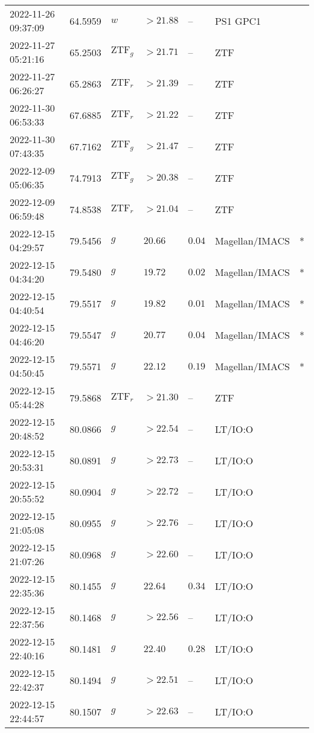 \documentclass{nature_plusfigure}
\begin{document}
\begin{supplement}
\begin{center}
\begin{longtable}{lllllll}
2022-11-26 09:37:09 & 64.5959 & $w$ & $>21.88$ & -- & PS1 GPC1 &  \\ 
2022-11-27 05:21:16 & 65.2503 & $\mathrm{ZTF}_{g}$ & $>21.71$ & -- & ZTF &  \\ 
2022-11-27 06:26:27 & 65.2863 & $\mathrm{ZTF}_{r}$ & $>21.39$ & -- & ZTF &  \\ 
2022-11-30 06:53:33 & 67.6885 & $\mathrm{ZTF}_{r}$ & $>21.22$ & -- & ZTF &  \\ 
2022-11-30 07:43:35 & 67.7162 & $\mathrm{ZTF}_{g}$ & $>21.47$ & -- & ZTF &  \\ 
2022-12-09 05:06:35 & 74.7913 & $\mathrm{ZTF}_{g}$ & $>20.38$ & -- & ZTF &  \\ 
2022-12-09 06:59:48 & 74.8538 & $\mathrm{ZTF}_{r}$ & $>21.04$ & -- & ZTF &  \\ 
2022-12-15 04:29:57 & 79.5456 & $g$ & $20.66$ & $0.04$ & Magellan/IMACS & * \\ 
2022-12-15 04:34:20 & 79.5480 & $g$ & $19.72$ & $0.02$ & Magellan/IMACS & * \\ 
2022-12-15 04:40:54 & 79.5517 & $g$ & $19.82$ & $0.01$ & Magellan/IMACS & * \\ 
2022-12-15 04:46:20 & 79.5547 & $g$ & $20.77$ & $0.04$ & Magellan/IMACS & * \\ 
2022-12-15 04:50:45 & 79.5571 & $g$ & $22.12$ & $0.19$ & Magellan/IMACS & * \\ 
2022-12-15 05:44:28 & 79.5868 & $\mathrm{ZTF}_{r}$ & $>21.30$ & -- & ZTF &  \\ 
2022-12-15 20:48:52 & 80.0866 & $g$ & $>22.54$ & -- & LT/IO:O &  \\ 
2022-12-15 20:53:31 & 80.0891 & $g$ & $>22.73$ & -- & LT/IO:O &  \\ 
2022-12-15 20:55:52 & 80.0904 & $g$ & $>22.72$ & -- & LT/IO:O &  \\ 
2022-12-15 21:05:08 & 80.0955 & $g$ & $>22.76$ & -- & LT/IO:O &  \\ 
2022-12-15 21:07:26 & 80.0968 & $g$ & $>22.60$ & -- & LT/IO:O &  \\ 
2022-12-15 22:35:36 & 80.1455 & $g$ & $22.64$ & $0.34$ & LT/IO:O &  \\ 
2022-12-15 22:37:56 & 80.1468 & $g$ & $>22.56$ & -- & LT/IO:O &  \\ 
2022-12-15 22:40:16 & 80.1481 & $g$ & $22.40$ & $0.28$ & LT/IO:O &  \\ 
2022-12-15 22:42:37 & 80.1494 & $g$ & $>22.51$ & -- & LT/IO:O &  \\ 
2022-12-15 22:44:57 & 80.1507 & $g$ & $>22.63$ & -- & LT/IO:O &  \\ 

\end{longtable}
\end{center}
\end{supplement}
\end{document}
